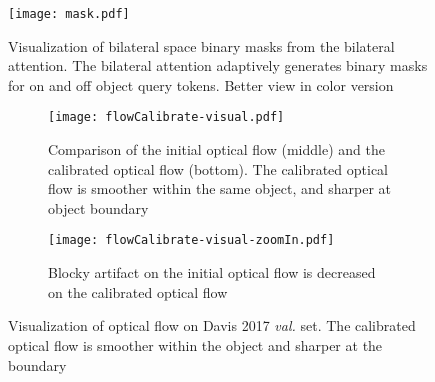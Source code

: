 \documentclass[runningheads]{llncs}
\begin{document}
\begin{figure}[t]
\centering
\texttt{[image: mask.pdf]}
\caption{Visualization of bilateral space binary masks from the bilateral attention. The bilateral attention adaptively generates binary masks for on and off object query tokens. Better view in color version}
\label{fig:mask}
\end{figure}






\begin{figure}[t]
    \centering
    \begin{subfigure}{\textwidth}
        \centering
        \texttt{[image: flowCalibrate-visual.pdf]}
        \caption{Comparison of the initial optical flow (middle) and the calibrated optical flow (bottom). The calibrated optical flow is smoother within the same object, and sharper at object boundary}
    \end{subfigure}
\begin{subfigure}{\textwidth}
        \centering
        \texttt{[image: flowCalibrate-visual-zoomIn.pdf]}
        \caption{Blocky artifact on the initial optical flow is decreased on the calibrated optical flow}
    \end{subfigure}
\caption{Visualization of optical flow on Davis 2017 \textsl{val.} set. The calibrated optical flow is smoother within the object and sharper at the boundary}
    \label{fig:flowCalib-example}
\end{figure}
\end{document}
